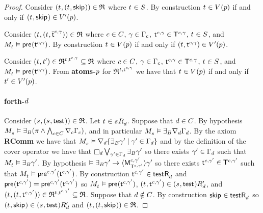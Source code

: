 \begin{proof}
Consider $(\kStateT, (\kStateT, \aStateSkip)) \in \refinement$ where $\kStateT \in \kStates$.
By construction $\kStateT \in \kValuation(\atomP)$ if and only if $(\kStateT, \aStateSkip) \in \kValuationP(\atomP)$.

Consider $(\kStateT, (\kStateT, \aPStateT[\agentC, \gamma])) \in \refinement$ where $\agentC \in \agentsC$, $\gamma \in \Gamma_\agentC$, $\aStateT[\agentC, \gamma] \in \aStatesT[\agentC, \gamma]$, $\kStateT \in \kStates$, and $\kPModel{\kStateT} \entails \aPrecondition(\aStateT[\agentC, \gamma])$.
By construction $\kStateT \in \kValuation(\atomP)$ if and only if $(\kStateT, \aStateT[\agentC, \gamma]) \in \kValuationP(\atomP)$.

Consider $(\kStateT, \kStateTP) \in \refinement^{\kStateT, \aStateT[\agentC, \gamma]} \subseteq \refinement$ where $\agentC \in \agentsC$, $\gamma \in \Gamma_\agentC$, $\aStateT[\agentC, \gamma] \in \aStatesT[\agentC, \gamma]$, $\kStateT \in \kStates$, and $\kPModel{\kStateT} \entails \aPrecondition(\aStateT[\agentC, \gamma])$.
From {\bf atoms-$\atomP$} for $\refinement^{\kStateT, \aStateT[\agentC, \gamma]}$ we have that $\kStateT \in \kValuation(\atomP)$ if and only if $\kStateTP \in \kValuationP(\atomP)$.

\paragraph{forth-$\agentD$}
Consider $(\kStateS, (\kStateS, \aStateTest)) \in \refinement$.
Let $\kStateT \in \kSuccessorsD{\kStateS}$.
Suppose that $\agentD \in \agentsC$.
By hypothesis $\kPModel{\kStateS} \entails \someactsBs (\pi \land \bigwedge_{\agentC \in \agentsC} \coversC \Gamma_\agentC)$, and in particular $\kPModel{\kStateS} \entails \someactsBs \coversD \Gamma_\agentD$.
By the \axiomAamlK{} axiom {\bf RComm} we have that $\kPModel{\kStateS} \entails \coversD \{\someactsBs \gamma' \mid \gamma' \in \Gamma_\agentD\}$ and by the definition of the cover operator we have that $\necessaryD \bigvee_{\gamma' \in \Gamma_\agentD} \someactsBs \gamma'$ so there exists $\gamma' \in \Gamma_\agentD$ such that $\kPModel{\kStateT} \entails \someactsBs \gamma'$.
By hypothesis $\entails \someactsBs \gamma' \implies \actionE{\aPModel[\agentC, \gamma']{\aStatesT[\agentC, \gamma']}} \gamma'$ so there exists $\aStateT[\agentC, \gamma'] \in \aStatesT[\agentC, \gamma']$ such that $\kPModel{\kStateT} \entails \aPrecondition[\agentC, \gamma'](\aStateT[\agentC, \gamma'])$.
By construction $\aStateT[\agentC, \gamma'] \in \aSuccessorsD{\aStateTest}$ and $\aPrecondition(\aStateT[\agentC, \gamma']) = \aPrecondition[\agentC, \gamma'](\aStateT[\agentC, \gamma'])$ so $\kPModel{\kStateT} \entails \aPrecondition(\aStateT[\agentC, \gamma'])$, $(\kStateT, \aStateT[\agentC, \gamma']) \in \kSuccessorsPD{(\kStateS, \aStateTest)}$, and $(\kStateT, (\kStateT, \aStateT[\agentC, \gamma'])) \in \refinement^{\kStateT, \aStateT[\agentC, \gamma']} \subseteq \refinement$.
Suppose that $\agentD \notin \agentsC$.
By construction $\aStateSkip \in \aSuccessorsD{\aStateTest}$ so $(\kStateT, \aStateSkip) \in \kSuccessorsPD{(\kStateS, \aStateTest)}$ and $(\kStateT, (\kStateT, \aStateSkip)) \in \refinement$.


\end{proof}
